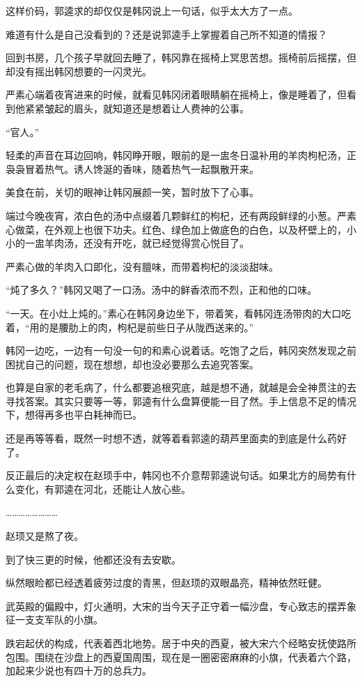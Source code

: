 这样价码，郭逵求的却仅仅是韩冈说上一句话，似乎太大方了一点。

难道有什么是自己没看到的？还是说郭逵手上掌握着自己所不知道的情报？

回到书房，几个孩子早就回去睡了，韩冈靠在摇椅上冥思苦想。摇椅前后摇摆，但却没有摇出韩冈想要的一闪灵光。

严素心端着夜宵进来的时候，就看见韩冈闭着眼睛躺在摇椅上，像是睡着了，但看到他紧紧皱起的眉头，就知道还是想着让人费神的公事。

“官人。”

轻柔的声音在耳边回响，韩冈睁开眼，眼前的是一盅冬日温补用的羊肉枸杞汤，正袅袅冒着热气。诱人馋涎的香味，随着热气一起飘散开来。

美食在前，关切的眼神让韩冈展颜一笑，暂时放下了心事。

端过今晚夜宵，浓白色的汤中点缀着几颗鲜红的枸杞，还有两段鲜绿的小葱。严素心做菜，在外观上也很下功夫。红色、绿色加上做底色的白色，以及杯壁上的，小小的一盅羊肉汤，还没有开吃，就已经觉得赏心悦目了。

严素心做的羊肉入口即化，没有膻味，而带着枸杞的淡淡甜味。

“炖了多久？”韩冈又喝了一口汤。汤中的鲜香浓而不烈，正和他的口味。

“一天。在小灶上炖的。”素心在韩冈身边坐下，带着笑，看韩冈连汤带肉的大口吃着，“用的是腰肋上的肉，枸杞是前些日子从陇西送来的。”

韩冈一边吃，一边有一句没一句的和素心说着话。吃饱了之后，韩冈突然发现之前困扰自己的问题，现在想想，却也没必要那么去追究答案。

也算是自家的老毛病了，什么都要追根究底，越是想不通，就越是会全神贯注的去寻找答案。其实只要等一等，郭逵有什么盘算便能一目了然。手上信息不足的情况下，想得再多也平白耗神而已。

还是再等等看，既然一时想不透，就等着看郭逵的葫芦里面卖的到底是什么药好了。

反正最后的决定权在赵顼手中，韩冈也不介意帮郭逵说句话。如果北方的局势有什么变化，有郭逵在河北，还能让人放心些。

……………………

赵顼又是熬了夜。

到了快三更的时候，他都还没有去安歇。

纵然眼睑都已经透着疲劳过度的青黑，但赵顼的双眼晶亮，精神依然旺健。

武英殿的偏殿中，灯火通明，大宋的当今天子正守着一幅沙盘，专心致志的摆弄象征一支支军队的小旗。

跌宕起伏的构成，代表着西北地势。居于中央的西夏，被大宋六个经略安抚使路所包围。围绕在沙盘上的西夏国周围，现在是一圈密密麻麻的小旗，代表着六个路，加起来少说也有四十万的总兵力。

